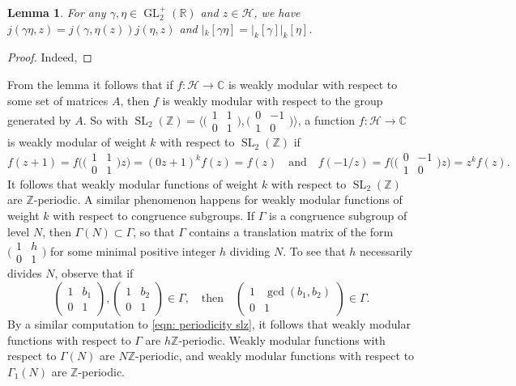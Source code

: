 \documentclass[10pt,leqno,twoside]{article}
\theoremstyle{plain}
\newtheorem{lemma}[lem]{Lemma}
\theoremstyle{definition}
\numberwithin{equation}{section}
\numberwithin{lem}{section}
\newcommand{\textib}[1]{\textbf{\textit{#1\index{#1}}}} %
\DeclareMathOperator{\GL}{GL}
\DeclareMathOperator{\SL}{SL}
\newcommand{\slz}{\SL_2(\mathbb{Z})}
\newcommand{\glrp}{\GL_2^+(\mathbb{R})}
\newcommand{\tbd}{{\Huge\color{red}{\textib{TBD}}}}
\begin{document}
\begin{lemma}\label{lem: props of automorphy}
    For any $\gamma,\eta\in \glrp$ and $z\in \mathcal H$, we have $j(\gamma\eta,z) = j(\gamma,\eta(z))j(\eta,z)$ and $|_k[\gamma\eta] = |_k[\gamma]|_k[\eta]$.
\end{lemma}
\begin{proof}
    Indeed, \tbd
\end{proof}
From the lemma it follows that if $f\colon \mathcal H\to\mathbb C$ is weakly modular with respect to some set of matrices $A$, then $f$ is weakly modular with respect to the group generated by $A$. So with $\slz = \big\langle\big(\!\begin{smallmatrix}
    1 & 1 \\ 0 & 1
\end{smallmatrix}\!\big), \big(\!\begin{smallmatrix}
    0 & -1 \\ 1 & 0
\end{smallmatrix}\!\big)\big\rangle$, a function $f\colon \mathcal H\to \mathbb C$ is weakly modular of weight $k$ with respect to $\slz$ if
\begin{equation}\label{eqn: periodicity slz}
    f(z+1) = f\big(\big(\!\begin{smallmatrix}
        1 & 1 \\ 0 & 1
    \end{smallmatrix}\!\big)z\big) = (0z+1)^kf(z) = f(z)\quad\text{and}\quad f(-1/z) = f\big(\big(\!\begin{smallmatrix}
        0 & -1 \\ 1 & 0
    \end{smallmatrix}\!\big)z\big) = z^kf(z).
\end{equation} It follows that weakly modular functions of weight $k$ with respect to $\slz$ are $\mathbb Z$-periodic. A similar phenomenon happens for weakly modular functions of weight $k$ with respect to congruence subgroups. If $\varGamma$ is a congruence subgroup of level $N$, then $\varGamma(N)\subset \varGamma$, so that $\varGamma$ contains a translation matrix of the form $\big(\!\begin{smallmatrix}
    1 & h \\ 0 & 1
\end{smallmatrix}\!\big)$ for some minimal positive integer $h$ dividing $N$. To see that $h$ necessarily divides $N$, observe that if 
\[\begin{pmatrix}
    1 & b_1 \\ 0 & 1
\end{pmatrix},\begin{pmatrix}
    1 & b_2 \\ 0 & 1
\end{pmatrix}\in\varGamma, \quad \text{then}\quad \begin{pmatrix}
    1 & \gcd(b_1,b_2) \\ 0 & 1
\end{pmatrix}\in \varGamma.\]
By a similar computation to \cref{eqn: periodicity slz}, it follows that weakly modular functions with respect to $\varGamma$ are $h\mathbb Z$-periodic. Weakly modular functions with respect to $\varGamma(N)$ are $N\mathbb{Z}$-periodic, and weakly modular functions with respect to $\varGamma_1(N)$ are $\mathbb Z$-periodic.
\end{document}
